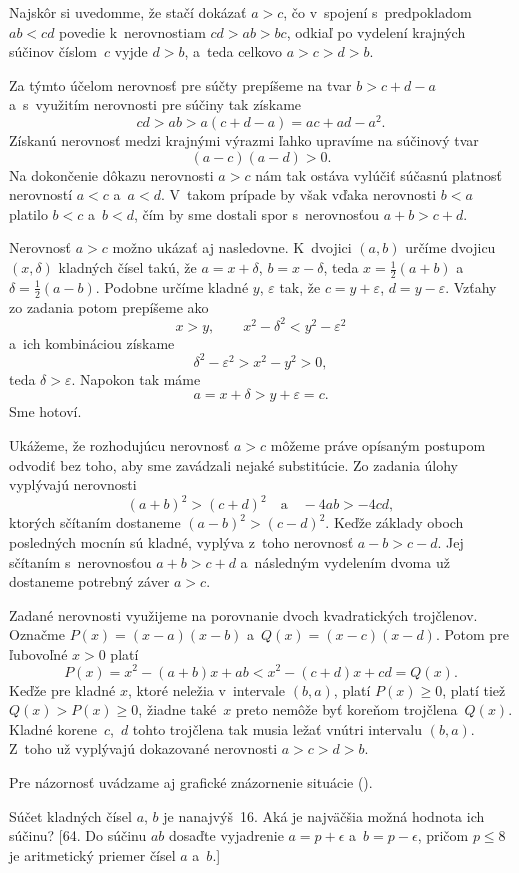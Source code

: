 ﻿{%
Najskôr si uvedomme, že stačí dokázať $a>c$, čo v~spojení s~predpokladom
$ab<cd$ povedie k~nerovnostiam $cd>ab>bc$, odkiaľ po vydelení krajných súčinov
číslom~$c$ vyjde $d>b$, a~teda celkovo $a>c>d>b$.

Za týmto účelom nerovnosť pre súčty prepíšeme na tvar $b > c + d - a$
a~s~využitím nerovnosti pre súčiny tak získame
$$
cd > ab > a(c+d-a) = ac +ad - a^2.
$$
Získanú nerovnosť medzi krajnými výrazmi ľahko upravíme na súčinový
tvar
$$
(a-c)(a-d) > 0.
$$
Na dokončenie dôkazu nerovnosti $a>c$ nám tak ostáva vylúčiť súčasnú
platnosť nerovností $a<c$ a~$a<d$. V~takom prípade by však vďaka nerovnosti $b<a$
platilo $b<c$ a~$b < d$, čím by sme dostali spor s~nerovnosťou $a+ b > c + d$.

\ineres
Nerovnosť $a>c$ možno ukázať aj nasledovne.
K~dvojici $(a, b)$ určíme dvojicu $(x, \delta)$ kladných
čísel takú, že $a= x + \delta$, $b = x - \delta$, teda
$x=\frac12(a+b)$ a~$\delta=\frac12(a-b)$. Podobne
určíme kladné $y$, $\varepsilon$ tak, že $c = y + \varepsilon$,
$d =y - \varepsilon$. Vzťahy zo zadania potom prepíšeme ako
$$
x > y, \qquad x^2 - \delta^2 < y^2 - \varepsilon^2
$$
a~ich kombináciou získame
$$
\delta^2 - \varepsilon^2 > x^2 - y^2 > 0,
$$
teda $\delta > \varepsilon$. Napokon tak máme
$$
a= x + \delta > y + \varepsilon = c.
$$
Sme hotoví.

\poznamka
Ukážeme, že rozhodujúcu nerovnosť $a>c$ môžeme práve opísaným
postupom odvodiť bez toho, aby sme zavádzali nejaké substitúcie. Zo zadania
úlohy vyplývajú nerovnosti
$$
(a+b)^2 > (c+d)^2 \quad\text{a}\quad -4ab > - 4cd,
$$
ktorých sčítaním dostaneme $(a-b)^2>(c-d)^2$. Keďže základy oboch
posledných mocnín sú kladné, vyplýva z~toho nerovnosť $a-b>c-d$. Jej
sčítaním s~nerovnosťou $a+b>c+d$ a~následným vydelením dvoma už
dostaneme potrebný záver $a>c$.


\ineres
Zadané nerovnosti využijeme na porovnanie dvoch kvadratických
trojčlenov. Označme
$P(x) = (x-a)(x-b)$ a~$Q(x) = (x-c)(x-d)$.
Potom pre ľubovoľné $x > 0$ platí
$$
P(x) = x^2 - (a+b)x + ab < x^2 - (c+d)x + cd = Q(x).
$$
Keďže pre kladné $x$, ktoré neležia v~intervale $(b, a)$, platí $P(x) \ge 0$, platí tiež
$Q(x) > P(x) \ge 0$, žiadne také~$x$ preto nemôže byť koreňom trojčlena~$Q(x)$.
Kladné korene~$c$,~$d$ tohto trojčlena tak musia ležať vnútri
intervalu $(b, a)$. Z~toho už vyplývajú dokazované nerovnosti $a> c > d> b$.

Pre názornosť uvádzame aj grafické znázornenie situácie (\obr).
%


Súčet kladných čísel $a$, $b$ je nanajvýš~16. Aká je
najväčšia možná hodnota ich súčinu?
[64. Do súčinu $ab$ dosaďte vyjadrenie $a=p+\epsilon$
a~$b=p-\epsilon$, pričom $p\le 8$ je aritmetický priemer čísel $a$ a~$b$.]

}
